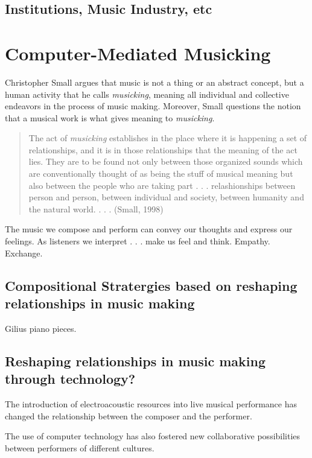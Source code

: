 \subsection{Institutions, Music Industry, etc} 

\section{Computer-Mediated Musicking}
Christopher Small argues that music is not a thing or an abstract concept, but a human activity that he calls \emph{musicking}, meaning all individual and collective endeavors in the process of music making. Moreover, Small questions the notion that a musical work is what gives meaning to \emph{musicking}. 

\begin{quote}
The act of \emph{musicking} establishes in the place where it is happening a set of relationships, and it is in those relationships that the meaning of the act lies. They are to be found not only between those organized sounds which are conventionally thought of as being the stuff of musical meaning but also between the people who are taking part . . . relashionships between person and person, between individual and society, between humanity and the natural world. . . . (Small, 1998)
\end{quote}

The music we compose and perform can convey our thoughts and express our feelings. As listeners we interpret . . . make us feel and think. Empathy. Exchange.  

\subsection{Compositional Stratergies based on reshaping relationships in music making}

Gilius piano pieces.

\subsection{Reshaping relationships in music making through technology?}

The introduction of electroacoustic resources into live musical performance has changed the relationship between the composer and the performer. 

The use of computer technology has also fostered new collaborative possibilities between performers of different cultures.


